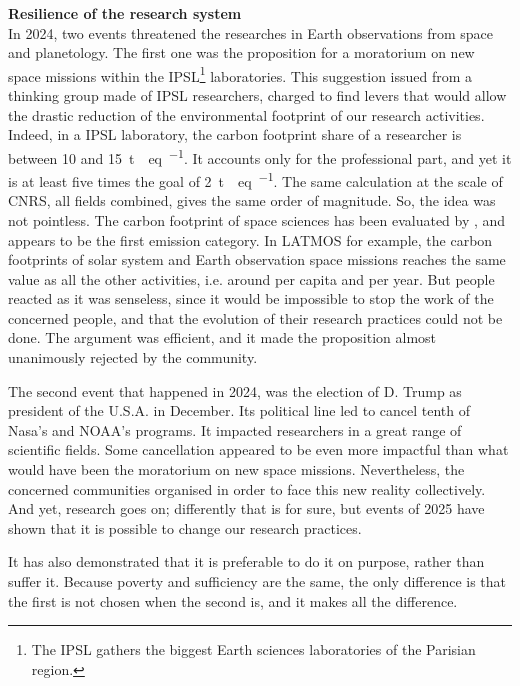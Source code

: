 \vspace{\baselineskip}
\textbf{Resilience of the research system}\\
In 2024, two events threatened the researches in Earth observations from space and planetology. 
The first one was the proposition for a moratorium on new space missions within the IPSL\footnote{The IPSL gathers the biggest Earth sciences laboratories of the Parisian region.} laboratories.
This suggestion issued from a thinking group made of IPSL researchers, charged to find levers that would allow the drastic reduction of the environmental footprint of our research activities.
Indeed, in a IPSL laboratory, the carbon footprint share of a researcher is between \num{10} and \SI{15}{\tonne{}eq\per\year}. 
It accounts only for the professional part, and yet it is at least five times the goal of \SI{2}{\tonne{}eq\per\year}.
The same calculation at the scale of CNRS, all fields combined, gives the same order of magnitude.
So, the idea was not pointless. The carbon footprint of space sciences has been evaluated by \citet{knodlseder_estimate_2022}, and appears to be the first emission category. In LATMOS for example, the carbon footprints of solar system and Earth observation space missions reaches the same value as all the other activities, i.e. around  per capita and per year.
But people reacted as it was senseless, since it would be impossible to stop the work of the concerned people, and that the evolution of their research practices could not be done.
The argument was efficient, and it made the proposition almost unanimously rejected by the community.

The second event that happened in 2024, was the election of D. Trump as president of the U.S.A. in December. 
Its political line led to cancel tenth of Nasa's and NOAA's programs. It impacted researchers in a great range of scientific fields.
Some cancellation appeared to be even more impactful than what would have been the moratorium on new space missions.
Nevertheless, the concerned communities organised in order to face this new reality collectively. And yet, research goes on; differently that is for sure, but events of 2025 have shown that it is possible to change our research practices.

It has also demonstrated that it is preferable to do it on purpose, rather than suffer it.
Because poverty and sufficiency are the same, the only difference is that the first is not chosen when the second is, and it makes all the difference.

